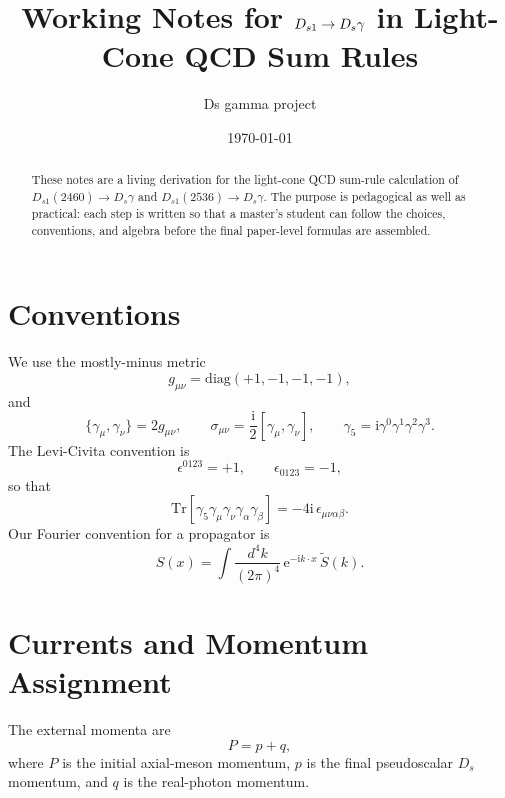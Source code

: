 \documentclass[11pt]{article}
\title{Working Notes for $\Dsone \to \Ds \gamma$ in Light-Cone QCD Sum Rules}
\author{Ds gamma project}
\date{\today}
\newcommand{\Ds}{D_s}
\newcommand{\Dsone}{D_{s1}}
\newcommand{\ii}{\mathrm{i}}
\newcommand{\ee}{\mathrm{e}}
\newcommand{\Tr}{\mathrm{Tr}}
\begin{document}
\maketitle

\begin{abstract}
These notes are a living derivation for the light-cone QCD sum-rule
calculation of $\Dsone(2460)\to\Ds\gamma$ and
$\Dsone(2536)\to\Ds\gamma$.  The purpose is pedagogical as well as practical:
each step is written so that a master's student can follow the choices,
conventions, and algebra before the final paper-level formulas are assembled.
\end{abstract}

\section{Conventions}

We use the mostly-minus metric
\begin{equation}
  g_{\mu\nu}=\mathrm{diag}(+1,-1,-1,-1),
\end{equation}
and
\begin{equation}
  \{\gamma_\mu,\gamma_\nu\}=2g_{\mu\nu},\qquad
  \sigma_{\mu\nu}=\frac{\ii}{2}[\gamma_\mu,\gamma_\nu],
  \qquad
  \gamma_5=\ii\gamma^0\gamma^1\gamma^2\gamma^3 .
\end{equation}
The Levi-Civita convention is
\begin{equation}
  \epsilon^{0123}=+1,\qquad \epsilon_{0123}=-1,
\end{equation}
so that
\begin{equation}
  \Tr[\gamma_5\gamma_\mu\gamma_\nu\gamma_\alpha\gamma_\beta]
  =-4\ii\,\epsilon_{\mu\nu\alpha\beta}.
\end{equation}
Our Fourier convention for a propagator is
\begin{equation}
  S(x)=\int\frac{d^4 k}{(2\pi)^4}\,\ee^{-\ii k\cdot x}\,\widetilde S(k).
\end{equation}

\section{Currents and Momentum Assignment}

The external momenta are
\begin{equation}
  P=p+q,
\end{equation}
where $P$ is the initial axial-meson momentum, $p$ is the final pseudoscalar
$\Ds$ momentum, and $q$ is the real-photon momentum.
\end{document}
